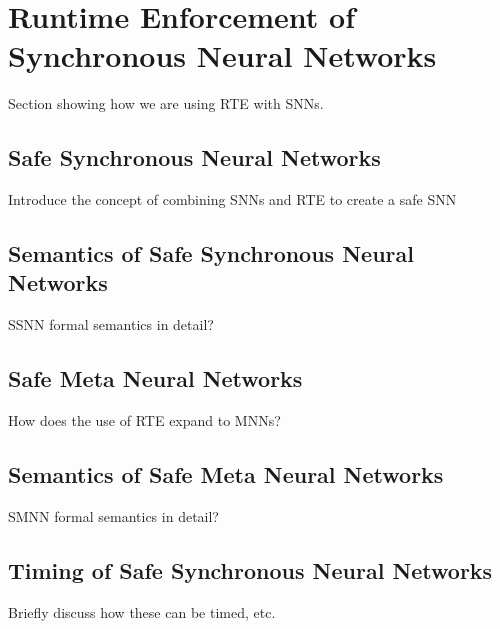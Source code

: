 \section{Runtime Enforcement of Synchronous Neural Networks}
Section showing how we are using RTE with SNNs.

\subsection{Safe Synchronous Neural Networks}
Introduce the concept of combining SNNs and RTE to create a safe SNN

\subsection{Semantics of Safe Synchronous Neural Networks}
SSNN formal semantics in detail?

\subsection{Safe Meta Neural Networks}
How does the use of RTE expand to MNNs?

\subsection{Semantics of Safe Meta Neural Networks}
SMNN formal semantics in detail?

\subsection{Timing of Safe Synchronous Neural Networks}
Briefly discuss how these can be timed, etc.